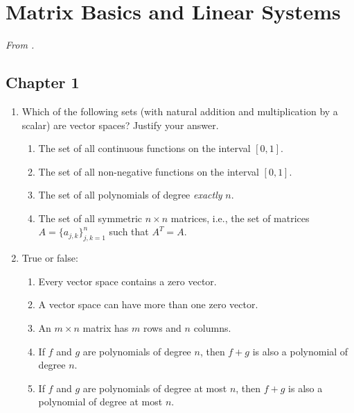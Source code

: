 \documentclass[../psets.tex]{subfiles}
\begin{document}
\section{Matrix Basics and Linear Systems}
\emph{From \textcite{bib:Treil}.}
\subsection*{Chapter 1}
\begin{enumerate}[label={\textbf{1.\arabic*.}}]
    \item {}Which of the following sets (with natural addition and multiplication by a scalar) are vector spaces? Justify your answer.
    \begin{enumerate}
        \item The set of all continuous functions on the interval $[0,1]$.
        \item The set of all non-negative functions on the interval $[0,1]$.
        \item The set of all polynomials of degree \emph{exactly} $n$.
        \item The set of all symmetric $n\times n$ matrices, i.e., the set of matrices $A=\{a_{j,k}\}_{j,k=1}^n$ such that $A^T=A$.
    \end{enumerate}
    \item True or false:
    \begin{enumerate}
        \item Every vector space contains a zero vector.
        \item A vector space can have more than one zero vector.
        \item An $m\times n$ matrix has $m$ rows and $n$ columns.
        \item If $f$ and $g$ are polynomials of degree $n$, then $f+g$ is also a polynomial of degree $n$.
        \item If $f$ and $g$ are polynomials of degree at most $n$, then $f+g$ is also a polynomial of degree at most $n$.
    \end{enumerate}
\end{enumerate}
\end{document}
